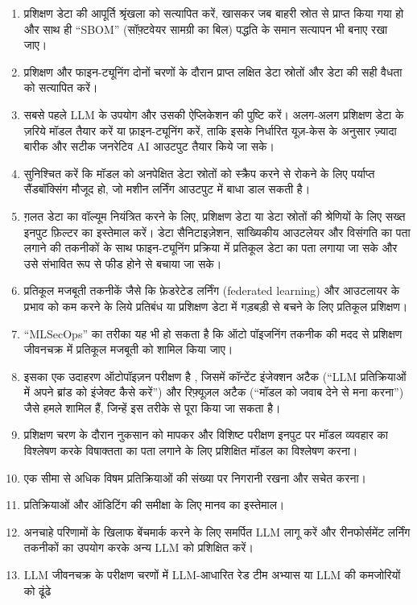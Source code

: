 \documentclass[
]{article}
\providecommand{\tightlist}{%
  \setlength{\itemsep}{0pt}\setlength{\parskip}{0pt}}
\begin{document}
\begin{enumerate}
\def\labelenumi{\arabic{enumi}.}
\tightlist
\item
  प्रशिक्षण डेटा की आपूर्ति श्रृंखला को सत्यापित करें, खासकर जब बाहरी स्रोत से प्राप्त
  किया गया हो और साथ ही ``SBOM'' (सॉफ़्टवेयर सामग्री का बिल) पद्धति के समान
  सत्यापन भी बनाए रखा जाए।
\item
  प्रशिक्षण और फाइन-ट्यूनिंग दोनों चरणों के दौरान प्राप्त लक्षित डेटा स्रोतों और डेटा
  की सही वैधता को सत्यापित करें।
\item
  सबसे पहले LLM के उपयोग और उसकी ऐप्लिकेशन की पुष्टि करें। अलग-अलग प्रशिक्षण डेटा के
  ज़रिये मॉडल तैयार करें या फ़ाइन-ट्यूनिंग करें, ताकि इसके निर्धारित यूज़-केस के अनुसार
  ज़्यादा बारीक और सटीक जनरेटिव AI आउटपुट तैयार किये जा सके।
\item
  सुनिश्चित करें कि मॉडल को अनपेक्षित डेटा स्रोतों को स्क्रैप करने से रोकने के लिए
  पर्याप्त सैंडबॉक्सिंग मौजूद हो, जो मशीन लर्निंग आउटपुट में बाधा डाल सकती है।
\item
  ग़लत डेटा का वॉल्यूम नियंत्रित करने के लिए, प्रशिक्षण डेटा या डेटा स्रोतों की श्रेणियों
  के लिए सख्त इनपुट फ़िल्टर का इस्तेमाल करें। डेटा सैनिटाइज़ेशन, सांख्यिकीय आउटलेयर और
  विसंगति का पता लगाने की तकनीकों के साथ फाइन-ट्यूनिंग प्रक्रिया में प्रतिकूल डेटा का
  पता लगाया जा सके और उसे संभावित रूप से फीड होने से बचाया जा सके।
\item
  प्रतिकूल मजबूती तकनीकें जैसे कि फ़ेडरेटेड लर्निंग (federated learning) और आउटलायर के
  प्रभाव को कम करने के लिये प्रतिबंध या प्रशिक्षण डेटा में गड़बड़ी से बचने के लिए प्रतिकूल
  प्रशिक्षण।
\item
  ``MLSecOps'' का तरीका यह भी हो सकता है कि ऑटो पॉइजनिंग तकनीक की मदद से
  प्रशिक्षण जीवनचक्र में प्रतिकूल मजबूती को शामिल किया जाए।
\item
  इसका एक उदाहरण ऑटोपॉइज़न परीक्षण है , जिसमें कॉन्टेंट इंजेक्शन अटैक (``LLM
  प्रतिक्रियाओं में अपने ब्रांड को इंजेक्ट कैसे करें'') और रिफ़्यूज़ल अटैक (``मॉडल को जवाब
  देने से मना करना'') जैसे हमले शामिल हैं, जिन्हें इस तरीके से पूरा किया जा सकता है।
\item
  प्रशिक्षण चरण के दौरान नुकसान को मापकर और विशिष्ट परीक्षण इनपुट पर मॉडल
  व्यवहार का विश्लेषण करके विषाक्तता का पता लगाने के लिए प्रशिक्षित मॉडल का
  विश्लेषण करना।
\item
  एक सीमा से अधिक विषम प्रतिक्रियाओं की संख्या पर निगरानी रखना और सचेत करना।
\item
  प्रतिक्रियाओं और ऑडिटिंग की समीक्षा के लिए मानव का इस्तेमाल।
\item
  अनचाहे परिणामों के खिलाफ बेंचमार्क करने के लिए समर्पित LLM लागू करें और रीनफोर्समेंट
  लर्निंग तकनीकों का उपयोग करके अन्य LLM को प्रशिक्षित करें।
\item
  LLM जीवनचक्र के परीक्षण चरणों में LLM-आधारित रेड टीम अभ्यास या LLM की कमजोरियों
  को ढूंढे
\end{enumerate}
\end{document}
